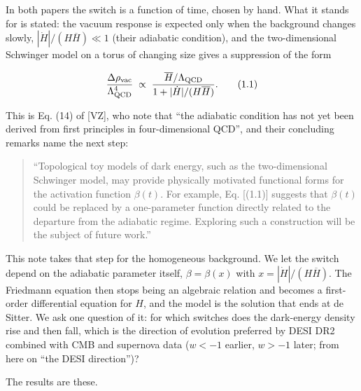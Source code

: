 \documentclass[11pt,a4paper]{article}
\begin{document}
In both papers the switch is a function of time, chosen by hand. What it stands for is stated: the vacuum response
is expected only when the background changes slowly, $|\dot H|/(H\overline{H}) \ll 1$ (their adiabatic condition),
and the two-dimensional Schwinger model on a torus of changing size gives a suppression of the form


\begin{equation*}
\frac{\Delta\rho_{\rm vac}}{\Lambda_{\rm QCD}^4} \;\propto\; \frac{\overline{H}/\Lambda_{\rm QCD}}{1 + |\dot H|/(H\overline{H})}. \tag{1.1}
\end{equation*}


This is Eq. (14) of [VZ], who note that ``the adiabatic condition has not yet been derived from first principles in four-dimensional QCD'', and
their concluding remarks name the next step:

\begin{quote}
``Topological toy models of dark energy, such as the two-dimensional Schwinger model, may provide physically
motivated functional forms for the activation function $\beta(t)$. For example, Eq. [(1.1)] suggests that $\beta(t)$
could be replaced by a one-parameter function directly related to the departure from the adiabatic regime.
Exploring such a construction will be the subject of future work.''

\end{quote}

This note takes that step for the homogeneous background. We let the switch depend on the adiabatic parameter
itself, $\beta = \beta(x)$ with $x = |\dot H|/(H\overline{H})$. The Friedmann equation then stops being an algebraic
relation and becomes a first-order differential equation for $H$, and the model is the solution that ends at de
Sitter. We ask one question of it: for which switches does the dark-energy density rise and then fall, which is the
direction of evolution preferred by DESI DR2 combined with CMB and supernova data ($w < -1$ earlier, $w > -1$ later;
from here on ``the DESI direction'')?

The results are these.
\end{document}
